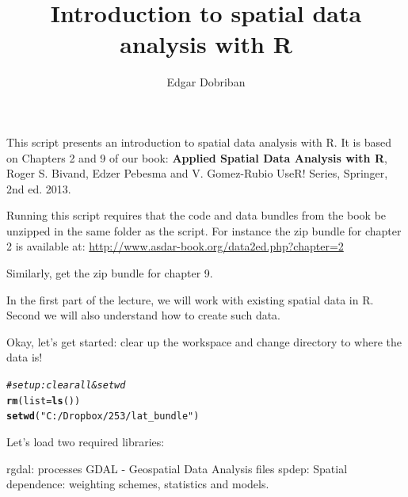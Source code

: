 \documentclass{article}\usepackage[]{graphicx}\usepackage[]{color}
\makeatletter
\newcommand{\hlstr}[1]{\textcolor[rgb]{0.192,0.494,0.8}{#1}}%
\newcommand{\hlcom}[1]{\textcolor[rgb]{0.678,0.584,0.686}{\textit{#1}}}%
\newcommand{\hlstd}[1]{\textcolor[rgb]{0.345,0.345,0.345}{#1}}%
\newcommand{\hlkwc}[1]{\textcolor[rgb]{0.333,0.667,0.333}{#1}}%
\newcommand{\hlkwd}[1]{\textcolor[rgb]{0.737,0.353,0.396}{\textbf{#1}}}%
\newenvironment{kframe}{%
 \def\at@end@of@kframe{}%
 \ifinner\ifhmode%
  \def\at@end@of@kframe{\end{minipage}}%
  \begin{minipage}{\columnwidth}%
 \fi\fi%
 \def\FrameCommand##1{\hskip\@totalleftmargin \hskip-\fboxsep
 \colorbox{shadecolor}{##1}\hskip-\fboxsep
     \hskip-\linewidth \hskip-\@totalleftmargin \hskip\columnwidth}%
 \MakeFramed {\advance\hsize-\width
   \@totalleftmargin\z@ \linewidth\hsize
   \@setminipage}}%
 {\par\unskip\endMakeFramed%
 \at@end@of@kframe}
\newenvironment{knitrout}{}{} %
\makeatother
\begin{document}
\title{Introduction to spatial data analysis with R}
\author{Edgar Dobriban}

\maketitle
This script presents an introduction to spatial data analysis with R. It is based on Chapters 2 and 9 of our book: \textbf{Applied Spatial Data Analysis with R}, Roger S. Bivand, Edzer Pebesma and V. Gomez-Rubio
 UseR! Series, Springer, 2nd ed. 2013.
 
Running this script requires that the code and data bundles from the book be unzipped in the same folder as the script. For instance the zip bundle for chapter 2 is available at: 
\url{http://www.asdar-book.org/data2ed.php?chapter=2}

Similarly, get the zip bundle for chapter 9.
 
In the first part of the lecture, we will work with existing spatial data in R. Second we will also understand how to create such data.

Okay, let's get started: clear up the workspace and change directory to where the data is!

\begin{knitrout}
\color{fgcolor}\begin{kframe}
\begin{alltt}
\hlcom{#set up: clear all  & set wd}
\hlkwd{rm}\hlstd{(}\hlkwc{list}\hlstd{=}\hlkwd{ls}\hlstd{())}
\hlkwd{setwd}\hlstd{(}\hlstr{"C:/Dropbox/253/lat_bundle"}\hlstd{)}
\end{alltt}
\end{kframe}
\end{knitrout}

Let's load two required libraries:

rgdal: processes GDAL - Geospatial Data Analysis files
spdep: Spatial dependence: weighting schemes, statistics and models.
\end{document}
